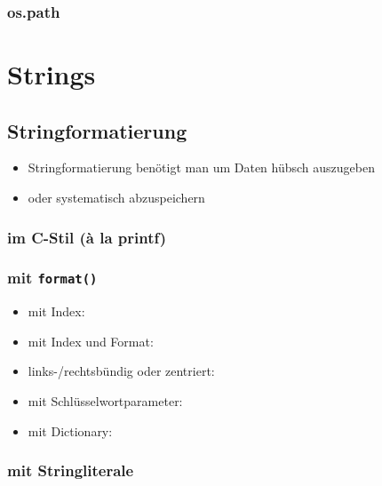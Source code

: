 \subsubsection{os.path}


\section{Strings}

\subsection{Stringformatierung}
\begin{itemize}
	\item Stringformatierung benötigt man um Daten hübsch auszugeben
	
	\item oder systematisch abzuspeichern
	
\end{itemize}

\subsubsection{im C-Stil (à la printf)}


\subsubsection{mit \texttt{format()}}
\begin{itemize}
	
	\item mit Index:
	
	\item mit Index und Format:
	
	\item links-/rechtsbündig oder zentriert:
	
	\item mit Schlüsselwortparameter:
	
	\item mit Dictionary:
	
\end{itemize}

\subsubsection{mit Stringliterale}


